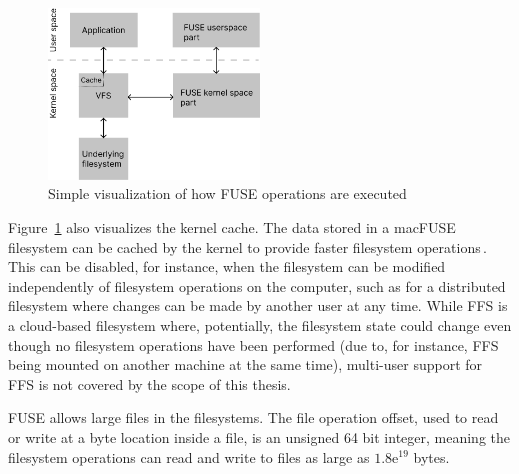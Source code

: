 \begin{figure}[!ht]
	\begin{center}
	  \includegraphics[width=0.5\textwidth]{figures/fuse_description.png}
	\end{center}
	\caption{Simple visualization of how \gls{FUSE} operations are executed}
	\label{fig:fuse_desc}
\end{figure}

Figure~\ref{fig:fuse_desc} also visualizes the kernel cache. The data stored in a macFUSE filesystem can be cached by the kernel to provide faster filesystem operations\,\cite{vangoorFUSENotFUSE2017, fleischerMountOptionsOsxfuse2020, gowdappaExperiencesFUSEReal2019}. This can be disabled, for instance, when the filesystem can be modified independently of filesystem operations on the computer, such as for a distributed filesystem where changes can be made by another user at any time. While \gls{FFS} is a \mbox{cloud-based} filesystem where, potentially, the filesystem state could change even though no filesystem operations have been performed (due to, for instance, \gls{FFS} being mounted on another machine at the same time), multi-user support for \gls{FFS} is not covered by the scope of this thesis.

\gls{FUSE} allows large files in the filesystems. The file operation offset, used to read or write at a byte location inside a file, is an unsigned 64 bit integer, meaning the filesystem operations can read and write to files as large as $1.8\text{e}^{19}$ bytes. 